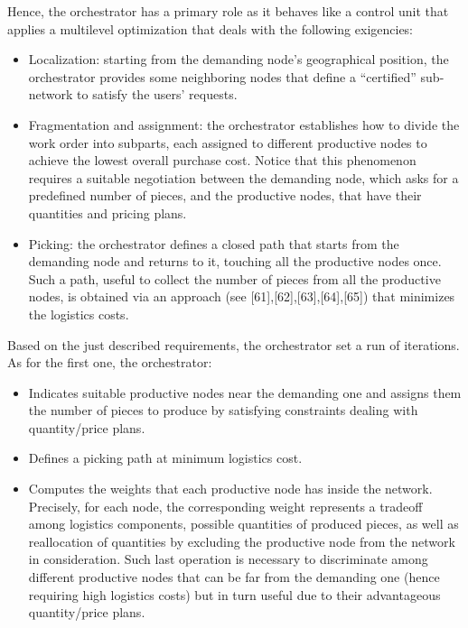 Hence, the orchestrator has a primary role as it behaves like a control unit that applies a multilevel optimization that deals with the following exigencies:
\begin{itemize}
    \item Localization: starting from the demanding node’s geographical position, the orchestrator provides some neighboring nodes that define a “certified” sub-network to satisfy the users’ requests.
    \item Fragmentation and assignment: the orchestrator establishes how to divide the work order into subparts, each assigned to different productive nodes to achieve the lowest overall purchase cost. Notice that this phenomenon requires a suitable negotiation between the demanding node, which asks for a predefined number of pieces, and the productive nodes, that have their quantities and pricing plans.
    \item Picking: the orchestrator defines a closed path that starts from the demanding node and returns to it, touching all the productive nodes once. Such a path, useful to collect the number of pieces from all the productive nodes, is obtained via an approach (see [61],[62],[63],[64],[65]) that minimizes the logistics costs.
\end{itemize}

Based on the just described requirements, the orchestrator set a run of iterations. As for the first one, the orchestrator:

\begin{itemize}
    \item Indicates suitable productive nodes near the demanding one and assigns them the number of pieces to produce by satisfying constraints dealing with quantity/price plans.
    \item Defines a picking path at minimum logistics cost.
    \item Computes the weights that each productive node has inside the
network. Precisely, for each node, the corresponding weight represents a tradeoff among logistics components, possible quantities of produced pieces, as well as reallocation of quantities by excluding the productive node from the network in consideration. Such last operation is necessary to discriminate among different productive nodes that can be far from the demanding one (hence requiring high logistics costs) but in turn useful due to their advantageous quantity/price plans.
\end{itemize}

